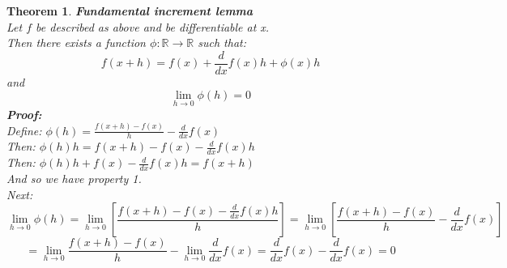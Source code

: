 \documentclass[12pt]{extarticle}
\theoremstyle{plain}
\newtheorem{thm}{Theorem}[section]
\theoremstyle{Definition}
\theoremstyle{Definition}
\theoremstyle{plain}
\begin{document}
\begin{thm} \textbf{Fundamental increment lemma} \\ 
	Let $f$ be described as above and be differentiable at x. \\ 
	Then there exists a function $\phi : \mathbb{R} \to \mathbb{R}$ such that: \\ 
	$$f(x + h) = f(x) + \frac{d}{dx} f(x)h + \phi(x)h$$
	and 
	$$\lim_{h \to 0} \phi(h) = 0$$ 
	\textbf{Proof:} \\ 
	Define: $\phi(h) = \frac{f(x+h) - f(x)}{h} - \frac{d}{dx} f(x)$ \\ 
	Then: $\phi(h)h = f(x+h) - f(x) - \frac{d}{dx} f(x)h$ \\ 
	Then: $\phi(h)h + f(x) - \frac{d}{dx} f(x)h = f(x + h)$ \\ 
	And so we have property 1. \\ 
	Next: \\ 
	$$\lim_{h \to 0} \phi(h) = \lim_{h \to 0} \left[\frac{f(x+h) - f(x) - \frac{d}{dx} f(x)h}{h}\right] = \lim_{h \to 0} \left[\frac{f(x+h) - f(x)}{h} - \frac{d}{dx} f(x)\right] $$
	$$= \lim_{h \to 0}\frac{f(x+h) - f(x)}{h} - \lim_{h \to 0} \frac{d}{dx} f(x) = \frac{d}{dx} f(x) - \frac{d}{dx} f(x) = 0$$
\end{thm}
\end{document}
